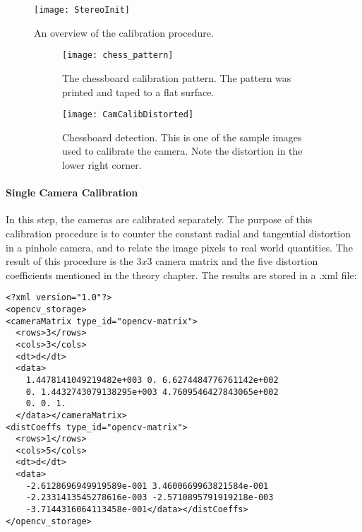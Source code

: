 \begin{figure}
	\texttt{[image: StereoInit]}
	\caption{An overview of the calibration procedure.}
	\label{fig:calibproc}
\end{figure}

\begin{figure}
	\centering
	\begin{subfigure}[b]{0.90\textwidth}
		\texttt{[image: chess\_pattern]}
		\caption{The chessboard calibration pattern. The pattern was printed and taped to a flat surface.}
		\label{fig:chesspattern}
	\end{subfigure}
	\begin{subfigure}[b]{0.90\textwidth}
		\texttt{[image: CamCalibDistorted]}
		\caption{Chessboard detection. This is one of the sample images used to calibrate the camera. Note the distortion in the lower right corner.}
		\label{fig:chessdetection}
	\end{subfigure}
	\caption{\label{fig:calibrationpattern}}
\end{figure}

\paragraph{Single Camera Calibration}

In this step, the cameras are calibrated separately.  The purpose of this calibration procedure is to counter the constant radial and tangential distortion in a pinhole camera, and to relate the image pixels to real world quantities. The result of this procedure is the $3x3$ camera matrix and the five distortion coefficients mentioned in the theory chapter. The results are stored in a .xml file:

\begin{verbatim}
<?xml version="1.0"?>
<opencv_storage>
<cameraMatrix type_id="opencv-matrix">
  <rows>3</rows>
  <cols>3</cols>
  <dt>d</dt>
  <data>
    1.4478141049219482e+003 0. 6.6274484776761142e+002 
    0. 1.4432743079138295e+003 4.7609546427843065e+002 
    0. 0. 1.
  </data></cameraMatrix>
<distCoeffs type_id="opencv-matrix">
  <rows>1</rows>
  <cols>5</cols>
  <dt>d</dt>
  <data>
    -2.6128696949919589e-001 3.4600669963821584e-001
    -2.2331413545278616e-003 -2.5710895791919218e-003
    -3.7144316064113458e-001</data></distCoeffs>
</opencv_storage>
\end{verbatim}

\newpage


